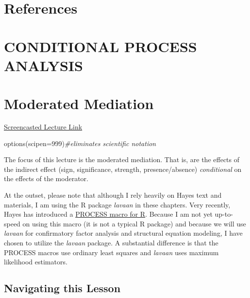 \documentclass[
]{book}
\newenvironment{Shaded}{\begin{snugshade}}{\end{snugshade}}
\newcommand{\AttributeTok}[1]{\textcolor[rgb]{0.77,0.63,0.00}{#1}}
\newcommand{\CommentTok}[1]{\textcolor[rgb]{0.56,0.35,0.01}{\textit{#1}}}
\newcommand{\DecValTok}[1]{\textcolor[rgb]{0.00,0.00,0.81}{#1}}
\newcommand{\FunctionTok}[1]{\textcolor[rgb]{0.00,0.00,0.00}{#1}}
\newcommand{\NormalTok}[1]{#1}
\begin{document}
\hypertarget{refs}{%
\chapter*{References}\label{refs}}

\hypertarget{CPAnal}{%
\chapter*{CONDITIONAL PROCESS ANALYSIS}\label{CPAnal}}

\hypertarget{ModMed}{%
\chapter{Moderated Mediation}\label{ModMed}}

\href{https://spu.hosted.panopto.com/Panopto/Pages/Viewer.aspx?pid=1d28d076-efad-4471-b52d-ad1601826f92}{Screencasted Lecture Link}

\begin{Shaded}
\begin{Highlighting}[]
\FunctionTok{options}\NormalTok{(}\AttributeTok{scipen=}\DecValTok{999}\NormalTok{)}\CommentTok{\#eliminates scientific notation}
\end{Highlighting}
\end{Shaded}

The focus of this lecture is the moderated mediation. That is, are the effects of the indirect effect (sign, significance, strength, presence/absence) \emph{conditional} on the effects of the moderator.

At the outset, please note that although I rely heavily on Hayes \citeyearpar{hayes_introduction_2018} text and materials, I am using the R package \emph{lavaan} in these chapters. Very recently, Hayes has introduced a \href{https://www.processmacro.org/index.html}{PROCESS macro for R}. Because I am not yet up-to-speed on using this macro (it is not a typical R package) and because we will use \emph{lavaan} for confirmatory factor analysis and structural equation modeling, I have chosen to utilize the \emph{lavaan} package. A substantial difference is that the PROCESS macros use ordinary least squares and \emph{lavaan} uses maximum likelihood estimators.

\hypertarget{navigating-this-lesson-7}{%
\section{Navigating this Lesson}\label{navigating-this-lesson-7}}
\end{document}
